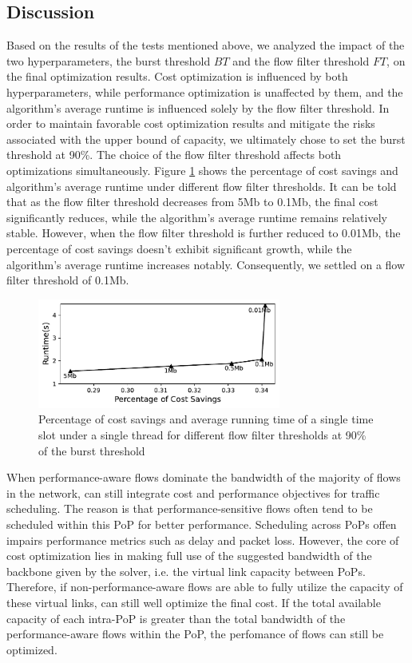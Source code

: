 \subsection{Discussion}
 Based on the results of the tests mentioned above, we analyzed the impact of the two hyperparameters, the burst threshold $BT$ and the flow filter threshold $FT$, on the final optimization results. Cost optimization is influenced by both hyperparameters, while performance optimization is unaffected by them, and the algorithm's average runtime is influenced solely by the flow filter threshold. In order to maintain favorable cost optimization results and mitigate the risks associated with the upper bound of {\egress} capacity, we ultimately chose to set the burst threshold at 90\%. The choice of the flow filter threshold affects both optimizations simultaneously. Figure \ref{fig:hyperChoose} shows the percentage of cost savings and algorithm's average runtime under different flow filter thresholds. It can be told that as the flow filter threshold decreases from 5Mb to 0.1Mb, the final cost significantly reduces, while the algorithm's average runtime remains relatively stable. However, when the flow filter threshold is further reduced to 0.01Mb, the percentage of cost savings doesn't exhibit significant growth, while the algorithm's average runtime increases notably. Consequently, we settled on a flow filter threshold of 0.1Mb.

\begin{figure}
	\centering
	\includegraphics[width = 8cm]{figs/evaluation/hyperChoose.pdf}
	\caption{\small Percentage of cost savings and average running time of a single time slot under a single thread for different flow filter thresholds at 90\% of the burst threshold}
	\label{fig:hyperChoose}
\end{figure}

 When performance-aware flows dominate the bandwidth of the majority of flows in the network, {\sys} can still integrate cost and performance objectives for traffic scheduling. The reason is that performance-sensitive flows often tend to be scheduled within this PoP for better performance. Scheduling across PoPs offen impairs performance metrics such as delay and packet loss. However, the core of cost optimization lies in making full use of the suggested bandwidth of the backbone given by the solver, i.e. the virtual link capacity between PoPs. Therefore, if non-performance-aware flows are able to fully utilize the capacity of these virtual links, {\sys} can still well optimize the final cost. If the total available capacity of each intra-PoP {\egress} is greater than the total bandwidth of the performance-aware flows within the PoP, the perfomance of flows can still be optimized.

